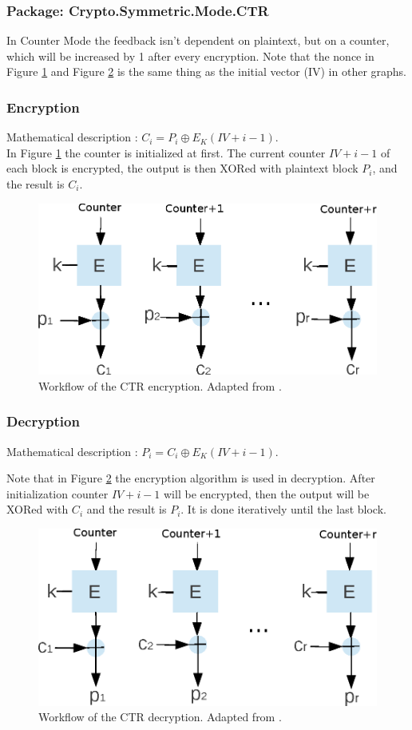 \subsubsection*{Package: Crypto.Symmetric.Mode.CTR}
In Counter Mode the feedback isn't dependent on plaintext, but on a
counter, which will be increased by 1 after every encryption. Note
that the nonce in Figure \ref{CTREN} and Figure \ref{CTRDE} is the
same thing as the initial vector (IV) in other graphs.

\subsubsection*{Encryption}
Mathematical description : $C_i=P_i\oplus E_K(IV+i-1)$.\\ In Figure
\ref{CTREN} the counter is initialized at first. The current counter
$IV+i-1$ of each block is encrypted, the output is then XORed with
plaintext block $P_i$, and the result is $C_i$.
\begin{figure}[h]
\centering
\includegraphics[scale=0.8]{./images/CTR_En}
\caption{Workflow of the CTR encryption. Adapted from
  \cite{DBLP:reference/crypt/2011}.}\label{CTREN}
\end{figure}
\subsubsection*{Decryption}
Mathematical description : $P_i=C_i\oplus E_K(IV+i-1)$.

Note that in Figure \ref{CTRDE} the encryption algorithm is used in
decryption.  After initialization counter $IV+i-1$ will be encrypted,
then the output will be XORed with $C_i$ and the result is $P_i$. It
is done iteratively until the last block.
\begin{figure}[h]
\centering
\includegraphics[scale=0.8]{./images/CTR_De}
\caption{Workflow of the CTR decryption. Adapted from
  \cite{DBLP:reference/crypt/2011}.}\label{CTRDE}
\end{figure}
